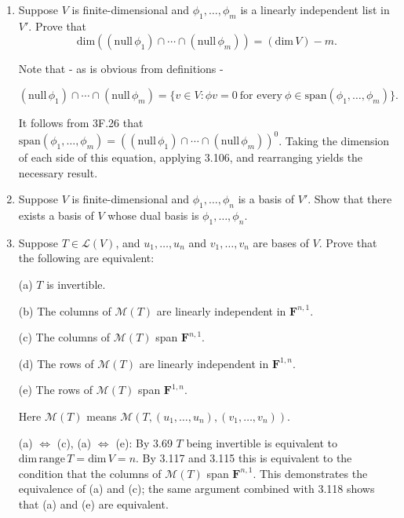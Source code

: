 \documentclass{book}
\begin{document}
\begin{enumerate}
\item Suppose \(V\) is finite-dimensional and \(\phi_1,\dots,\phi_m\) is a linearly independent list in \(V'\).  Prove that \[\textrm{dim}((\textrm{null} \, \phi_1) \cap \dotsm \cap (\textrm{null} \, \phi_m))=(\textrm{dim} \, V) - m.\]

Note that - as is obvious from definitions -

\begin{equation*}
    (\textrm{null} \, \phi_1) \cap \dotsm \cap (\textrm{null} \, \phi_m) = \{v \in V:\phi v = 0 \ \text{for every} \ \phi \in \text{span}(\phi_1,\dots,\phi_m)\}.
\end{equation*}

It follows from 3F.26 that \(\text{span}(\phi_1,\dots,\phi_m)=\left( (\textrm{null} \, \phi_1) \cap \dotsm \cap (\textrm{null} \, \phi_m) \right)^0\).  Taking the dimension of each side of this equation, applying 3.106, and rearranging yields the necessary result.

\item Suppose \(V\) is finite-dimensional and \(\phi_1,\dots,\phi_n\) is a basis of \(V'\).  Show that there exists a basis of \(V\) whose dual basis is \(\phi_1,\dots,\phi_n\).


\item Suppose \(T \in \mathcal{L}(V)\), and \(u_1,\dots,u_n\) and \(v_1,\dots,v_n\) are bases of \(V\).  Prove that the following are equivalent:

(a) \(T\) is invertible.

(b) The columns of \(\mathcal{M}(T)\) are linearly independent in \(\textbf{F}^{n,1}\).

(c) The columns of \(\mathcal{M}(T)\) span \(\textbf{F}^{n,1}\).

(d) The rows of \(\mathcal{M}(T)\) are linearly independent in \(\textbf{F}^{1,n}\).

(e) The rows of \(\mathcal{M}(T)\) span \(\textbf{F}^{1,n}\).

Here \(\mathcal{M}(T)\) means \(\mathcal{M}(T,(u_1,\dots,u_n),(v_1,\dots,v_n))\).

(a) \(\iff\) (c), (a) \(\iff\) (e): By 3.69 \(T\) being invertible is equivalent to \(\text{dim} \, \text{range} \, T = \text{dim} \, V = n\).  By 3.117 and 3.115 this is equivalent to the condition that the columns of \(\mathcal{M}(T)\) span \(\textbf{F}^{n,1}\).  This demonstrates the equivalence of (a) and (c); the same argument combined with 3.118 shows that (a) and (e) are equivalent.


\end{enumerate}
\end{document}
